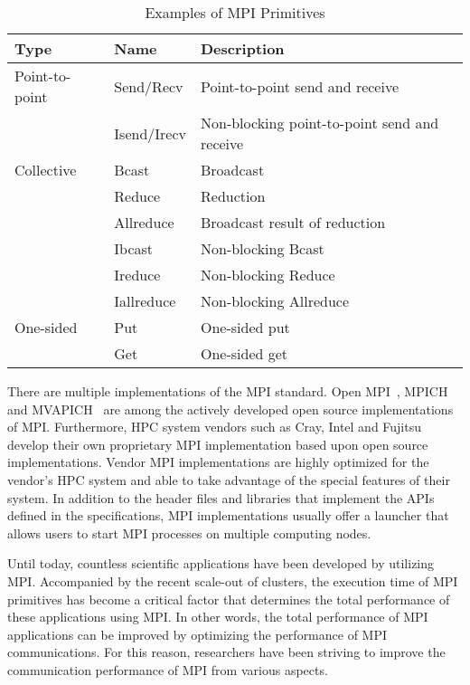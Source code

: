 \begin{table}[]
    \centering
    \caption{Examples of MPI Primitives}%
    \label{tbl:mpi-primitives}
\begin{tabular}{@{}lll@{}}
\toprule
Type           & Name        & Description \\ \midrule
Point-to-point & Send/Recv   & Point-to-point send and receive              \\
               & Isend/Irecv & Non-blocking point-to-point send and receive \\
\midrule
Collective     & Bcast       & Broadcast                                    \\
               & Reduce      & Reduction                                    \\
               & Allreduce   & Broadcast result of reduction                \\
               & Ibcast      & Non-blocking Bcast                           \\
               & Ireduce     & Non-blocking Reduce                          \\
               & Iallreduce  & Non-blocking Allreduce                       \\
\midrule
One-sided      & Put         & One-sided put                                \\
               & Get         & One-sided get                                \\
\bottomrule
\end{tabular}
\end{table}

There are multiple implementations of the MPI standard. Open
MPI~\cite{Squyres2005}, MPICH~\cite{Gropp2002} and MVAPICH~\cite{mvapich} are
among the actively developed open source implementations of MPI\@.
Furthermore, HPC system vendors such as Cray, Intel and Fujitsu develop their
own proprietary MPI implementation based upon open source implementations.
Vendor MPI implementations are highly optimized for the vendor's HPC system
and able to take advantage of the special features of their system. In
addition to the header files and libraries that implement the APIs defined in
the specifications, MPI implementations usually offer a launcher that allows
users to start MPI processes on multiple computing nodes.

Until today, countless scientific applications have been developed by
utilizing MPI\@. Accompanied by the recent scale-out of clusters, the
execution time of MPI primitives has become a critical factor that determines
the total performance of these applications using MPI\@. In other words, the
total performance of MPI applications can be improved by optimizing the
performance of MPI communications. For this reason, researchers have been
striving to improve the communication performance of MPI from various aspects.

